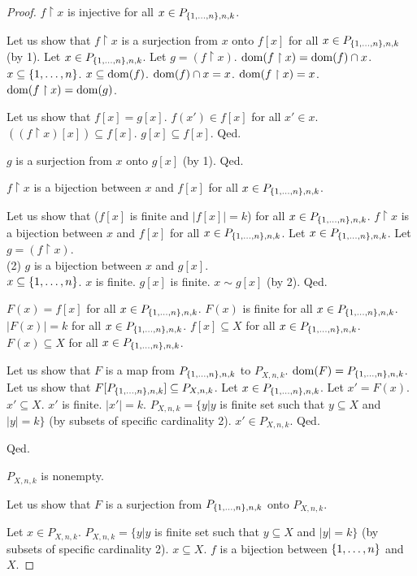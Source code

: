\documentclass{article}
\begin{document}
\begin{forthel}
\begin{proof}
$f \upharpoonright x$ is injective for all $x \in P_{\{1,\dots,n\},n,k}$.

Let us show that $f \upharpoonright x$ is a surjection from $x$ onto $f[x]$ for all $x \in P_{\{1,\dots,n\},n,k}$ (by 1).
Let $x \in P_{\{1,\dots,n\},n,k}$.
Let $g=(f \upharpoonright x)$.
$\operatorname{dom}(f \upharpoonright x) = \operatorname{dom}(f) \cap x$.
$x \subseteq \{1,\dots,n\}$.
$x \subseteq \operatorname{dom}(f)$.
$\operatorname{dom}(f) \cap x = x$.
$\operatorname{dom}(f \upharpoonright x) = x$.
$\operatorname{dom}(f \upharpoonright x) = \operatorname{dom}(g)$.

Let us show that $f[x] = g[x]$.
$f(x') \in f[x]$ for all $x' \in x$.
$((f \upharpoonright x)[x]) \subseteq f[x]$.
$g[x] \subseteq f[x]$.
Qed.

$g$ is a surjection from $x$ onto $g[x]$ (by 1).
Qed.

$f \upharpoonright x$ is a bijection between $x$ and $f[x]$ for all $x \in P_{\{1,\dots,n\},n,k}$.

Let us show that ($f[x]$ is finite and $|f[x]|=k$) for all $x \in P_{\{1,\dots,n\},n,k}$.
$f \upharpoonright x$ is a bijection between $x$ and $f[x]$ for all $x \in P_{\{1,\dots,n\},n,k}$.
Let $x \in P_{\{1,\dots,n\},n,k}$.
Let $g=(f \upharpoonright x)$.\\
(2) $g$ is a bijection between $x$ and $g[x]$.\\
$x \subseteq \{1,\dots,n\}$.
$x$ is finite.
$g[x]$ is finite.
$x \sim g[x]$ (by 2).
Qed.

$F(x)=f[x]$ for all  $x \in P_{\{1,\dots,n\},n,k}$.
$F(x)$ is finite for all  $x \in P_{\{1,\dots,n\},n,k}$.
$|F(x)| = k$ for all  $x \in P_{\{1,\dots,n\},n,k}$.
$f[x] \subseteq X$ for all  $x \in P_{\{1,\dots,n\},n,k}$.
$F(x) \subseteq X$ for all $x \in P_{\{1,\dots,n\},n,k}$.

Let us show that $F$ is a map from $P_{\{1,\dots,n\},n,k}$ to $P_{X,n,k}$.
$\operatorname{dom}(F) = P_{\{1,\dots,n\},n,k}$.
Let us show that $F[P_{\{1,\dots,n\},n,k}] \subseteq P_{X,n,k}$.
Let $x \in P_{\{1,\dots,n\},n,k}$.
Let $x' = F(x)$.
$x' \subseteq X$.
$x'$ is finite.
$|x'|=k$.
$P_{X,n,k} = \{y | y$ is finite set such that $y \subseteq X$ and $|y| = k\}$ (by subsets of specific cardinality 2).
$x' \in P_{X,n,k}$.
Qed.

Qed.

$P_{X,n,k}$ is nonempty.




Let us show that $F$ is a surjection from $P_{\{1,\dots,n\},n,k}$ onto $P_{X,n,k}$.

Let $x \in P_{X,n,k}$.
$P_{X,n,k} = \{y | y$ is finite set such that $y \subseteq X$ and $|y| = k\}$ (by subsets of specific cardinality 2).
$x \subseteq X$.
$f$ is a bijection between $\{1,\dots,n\}$ and $X$.


\end{proof}
\end{forthel}
\end{document}
